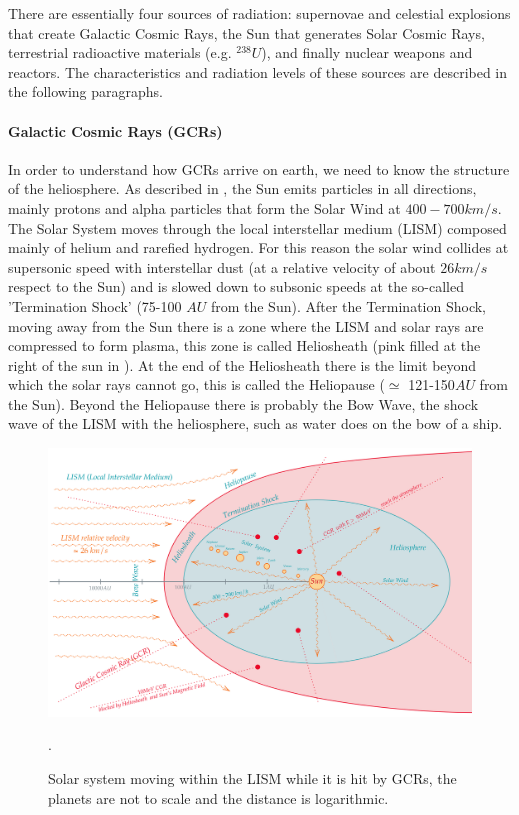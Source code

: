 {{{{				There are essentially four sources of radiation: supernovae and celestial explosions that create Galactic Cosmic Rays, the Sun that generates Solar Cosmic Rays, terrestrial radioactive materials (e.g. $^{238}U$), and finally nuclear weapons and reactors. The characteristics and radiation levels of these sources are described in the following paragraphs.
				
				
				\paragraph{Galactic Cosmic Rays (GCRs)}{
						In order to understand how GCRs arrive on earth, we need to know the structure of the heliosphere. 
						As described in , the Sun emits particles in all directions, mainly protons and alpha particles that form the Solar Wind at $400-700km/s$. The Solar System moves through the local interstellar medium (LISM) composed mainly of helium and rarefied hydrogen. For this reason the solar wind collides at supersonic speed with interstellar dust (at a relative velocity of about $26km/s$ respect to the Sun) and is slowed down to subsonic speeds at the so-called 'Termination Shock' (75-100 $AU$ from the Sun). After the Termination Shock, moving away from the Sun there is a zone where the LISM and solar rays are compressed to form plasma, this zone is called Heliosheath (pink filled at the right of the sun in ). At the end of the Heliosheath there is the limit beyond which the solar rays cannot go, this is called the Heliopause ($\simeq$ 121-150$AU$ from the Sun). Beyond the Heliopause there is probably the Bow Wave, the shock wave of the LISM with the heliosphere, such as water does on the bow of a ship.
						
						
						\begin{figure}[H]
							\centering
							\includegraphics[scale=0.16,center]{./images/SolarSystem_GCRs.png}
							\caption{Solar system moving within the LISM while it is hit by GCRs, the planets are not to scale and the distance is logarithmic.}.
							\label{fig:SolarSystemGCRs}
						\end{figure} 
					
}}}}}
